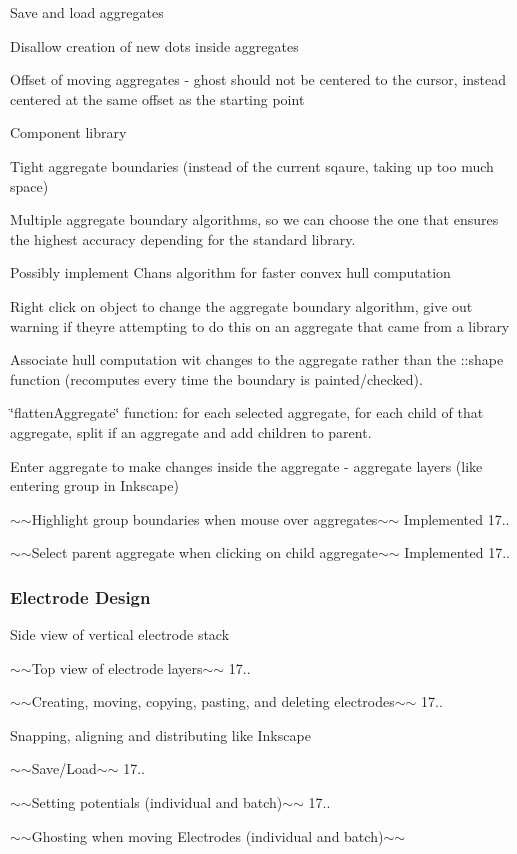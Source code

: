 \begin{DoxyItemize}
\item Save and load aggregates
\item Disallow creation of new dots inside aggregates
\item Offset of moving aggregates -\/ ghost should not be centered to the cursor, instead centered at the same offset as the starting point
\item Component library
\item Tight aggregate boundaries (instead of the current sqaure, taking up too much space)
\begin{DoxyItemize}
\item Multiple aggregate boundary algorithms, so we can choose the one that ensures the highest accuracy depending for the standard library.
\item Possibly implement Chan\textquotesingle{}s algorithm for faster convex hull computation
\item Right click on object to change the aggregate boundary algorithm, give out warning if they\textquotesingle{}re attempting to do this on an aggregate that came from a library
\item Associate hull computation wit changes to the aggregate rather than the \+::shape function (recomputes every time the boundary is painted/checked).
\end{DoxyItemize}
\item \char`\"{}flatten\+Aggregate\char`\"{} function\+: for each selected aggregate, for each child of that aggregate, split if an aggregate and add children to parent.
\item Enter aggregate to make changes inside the aggregate -\/ aggregate layers (like entering group in Inkscape)
\item $\sim$$\sim$\+Highlight group boundaries when mouse over aggregates$\sim$$\sim$ Implemented 17..
\item $\sim$$\sim$\+Select parent aggregate when clicking on child aggregate$\sim$$\sim$ Implemented 17..
\end{DoxyItemize}

\subsubsection*{Electrode Design}


\begin{DoxyItemize}
\item Side view of vertical electrode stack
\item $\sim$$\sim$\+Top view of electrode layers$\sim$$\sim$ 17..
\item $\sim$$\sim$\+Creating, moving, copying, pasting, and deleting electrodes$\sim$$\sim$ 17..
\item Snapping, aligning and distributing like Inkscape
\item $\sim$$\sim$\+Save/\+Load$\sim$$\sim$ 17..
\item $\sim$$\sim$\+Setting potentials (individual and batch)$\sim$$\sim$ 17..
\item $\sim$$\sim$\+Ghosting when moving Electrodes (individual and batch)$\sim$$\sim$
\end{DoxyItemize}

